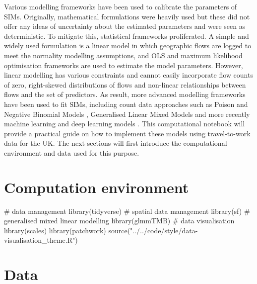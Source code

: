 \documentclass[
  a4paper, 
  twoside,
  final
]{article}
\newenvironment{Shaded}{\begin{snugshade}}{\end{snugshade}}
\newcommand{\CommentTok}[1]{\textcolor[rgb]{0.37,0.37,0.37}{#1}}
\newcommand{\FunctionTok}[1]{\textcolor[rgb]{0.28,0.35,0.67}{#1}}
\newcommand{\NormalTok}[1]{\textcolor[rgb]{0.00,0.23,0.31}{#1}}
\newcommand{\StringTok}[1]{\textcolor[rgb]{0.13,0.47,0.30}{#1}}
\newcounter{code}
\begin{document}
Various modelling frameworks have been used to calibrate the parameters
of SIMs. Originally, mathematical formulations were heavily used but
these did not offer any ideas of uncertainty about the estimated
parameters and were seen as deterministic. To mitigate this, statistical
frameworks proliferated. A simple and widely used formulation is a
linear model in which geographic flows are logged to meet the normality
modelling assumptions, and OLS and maximum likelihood optimisation
frameworks are used to estimate the model parameters. However, linear
modelling has various constraints and cannot easily incorporate flow
counts of zero, right-skewed distributions of flows and non-linear
relationships between flows and the set of predictors. As result, more
advanced modelling frameworks have been used to fit SIMs, including
count data approaches such as Poison and Negative Binomial Models
\citep{rowe2023urban}, Generalised Linear Mixed Models
\citep{apariciocastro2023} and more recently machine learning
\citep{rowe2022} and deep learning models \citep{simini2021}. This
computational notebook will provide a practical guide on how to
implement these models using travel-to-work data for the UK. The next
sections will first introduce the computational environment and data
used for this purpose.

\section{Computation environment}\label{sec-comenv}

\begin{Shaded}
\begin{Highlighting}[]
\CommentTok{\# data management }
\FunctionTok{library}\NormalTok{(tidyverse)}
\CommentTok{\# spatial data management}
\FunctionTok{library}\NormalTok{(sf)}
\CommentTok{\# generalised mixed linear modelling}
\FunctionTok{library}\NormalTok{(glmmTMB)}
\CommentTok{\# data visualisation}
\FunctionTok{library}\NormalTok{(scales)}
\FunctionTok{library}\NormalTok{(patchwork)}
\FunctionTok{source}\NormalTok{(}\StringTok{"../../code/style/data{-}visualisation\_theme.R"}\NormalTok{)}
\end{Highlighting}
\end{Shaded}

\section{Data}\label{sec-data}
\end{document}
